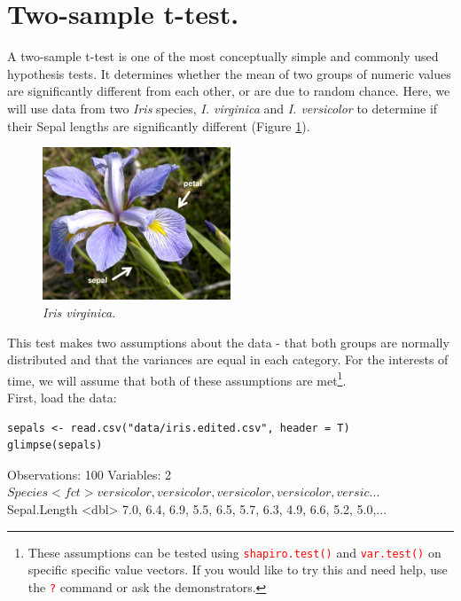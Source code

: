 \documentclass[a4paper,12pt]{article}
\newcommand\code[1]{\textcolor{red}{\texttt{#1}}}
\begin{document}
\section{Two-sample t-test.}

A two-sample t-test is one of the most conceptually simple and commonly used hypothesis tests. It determines whether the mean of two groups of numeric values are significantly different from each other, or are due to random chance. Here, we will use data from two \textit{Iris} species, \textit{I. virginica} and \textit{I. versicolor} to determine if their Sepal lengths are significantly different (Figure \ref{fig:IrisVirginica}). \\

\begin{figure}[h]
\centering 
\includegraphics[width=0.5\textwidth]{figs/Irisvirginica.jpg}
\caption{\textit{Iris virginica.}}
\label{fig:IrisVirginica}
\end{figure} 

This test makes two assumptions about the data - that both groups are normally distributed and that the variances are equal in each category. For the interests of time, we will assume that both of these assumptions are met\footnote{These assumptions can be tested using \code{shapiro.test()} and \code{var.test()} on specific specific value vectors. If you would like to try this and need help, use the \code{?} command or ask the demonstrators.}.\\

First, load the data:

\begin{shaded}
\begin{verbatim}
sepals <- read.csv("data/iris.edited.csv", header = T)
glimpse(sepals)
\end{verbatim}


\begin{Schunk}
\begin{Soutput}
Observations: 100
Variables: 2
$ Species      <fct> versicolor, versicolor, versicolor, versicolor, versic...
$ Sepal.Length <dbl> 7.0, 6.4, 6.9, 5.5, 6.5, 5.7, 6.3, 4.9, 6.6, 5.2, 5.0,...
\end{Soutput}
\end{Schunk}
\end{shaded}
\end{document}

